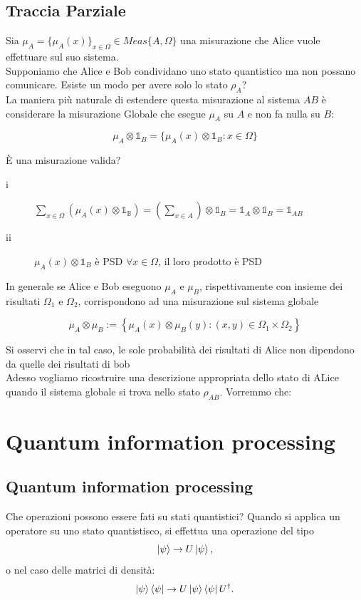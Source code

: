 \documentclass{report}
\begin{document}
\newpage
\section{Traccia Parziale}
Sia $\mu_A=\{\mu_A(x)\}_{x\in\Omega} \in \textit{Meas}\{A,\Omega\}$ una misurazione che Alice vuole effettuare sul suo sistema.\\
Supponiamo che Alice e Bob condividano uno stato quantistico ma non possano comunicare. Esiste un modo per avere solo lo stato $\rho_A$?
\medskip\\
La maniera più naturale di estendere questa misurazione al sistema $AB$ è considerare la misurazione Globale che esegue 
$\mu_A$ su $A$ e non fa nulla su $B$:

$$
    \mu_A\otimes\mathbb{1}_B=\{\mu_A(x)\otimes\mathbb{1}_B:x\in\Omega\}
$$

È una misurazione valida?
\begin{description}
    \item[i]    $\sum_{x\in\Omega}(\mu_A(x)\otimes\mathbb{1_B})=\left(\sum_{x\in A}\right)\otimes\mathbb{1}_B =\mathbb{1}_A\otimes\mathbb{1}_B=\mathbb{1}_{AB}$
    \item[ii]   $\mu_A(x)\otimes\mathbb{1}_B$ è PSD $\forall x \in \Omega$, il loro prodotto è PSD
\end{description}

In generale se Alice e Bob eseguono $\mu_A$ e $\mu_B$, rispettivamente con insieme dei risultati $\Omega_1$ e $\Omega_2$, corrispondono ad una misurazione sul sistema globale

$$
    \mu_A\otimes\mu_B:=\left\{ \mu_A(x)\otimes\mu_B(y) :(x,y)\in \Omega_1 \times\Omega_2 \right\}
$$

Si osservi che in tal caso, le sole probabilità dei risultati di Alice non dipendono da quelle dei risultati di bob
\medskip\\
Adesso vogliamo ricostruire una descrizione appropriata dello stato di ALice quando il sistema globale si trova nello stato $\rho_{AB}$. Vorremmo che:




\chapter{Quantum information processing}

\section{Quantum information processing}
Che operazioni possono essere fati su stati quantistici? Quando si applica un operatore su uno stato quantistisco, si effettua una operazione del tipo
\begin{equation}
\ket\psi \to U\ket\psi,
\end{equation}
%
o nel caso delle matrici di densità:
\begin{equation}
	\ket\psi\bra\psi \to U\ket\psi\bra\psi U^\dagger.
\end{equation}
\end{document}
